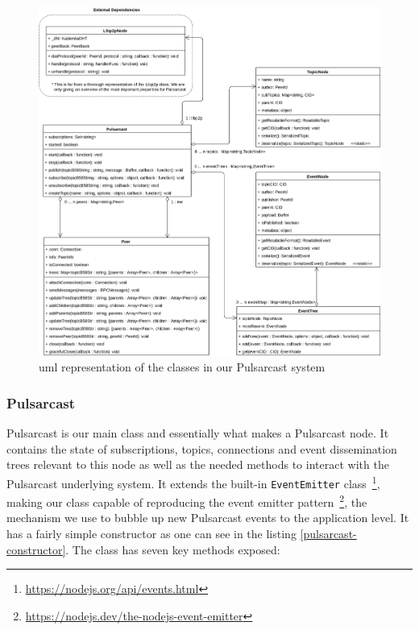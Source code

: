 \begin{figure}[hb!]
  \center
  \includegraphics[width=1\textwidth]{img/uml-pulsarcast.png}
  \caption{\acrshort{uml} representation of the classes in our Pulsarcast system}
  \label{fig:pulsarcast-uml}
\end{figure}

\subsubsection{Pulsarcast}\label{subsubsec:pulsarcast}

Pulsarcast is our main class and essentially what makes a Pulsarcast node. It
contains the state of subscriptions, topics, connections and event
dissemination trees relevant to this node as well as the needed methods to
interact with the Pulsarcast underlying system. It extends the built-in
\verb|EventEmitter| class~\footnote{\url{https://nodejs.org/api/events.html}}, making
our class capable of reproducing the event emitter
pattern~\footnote{\url{https://nodejs.dev/the-nodejs-event-emitter}}, the mechanism
we use to bubble up new Pulsarcast events to the application level. It has a
fairly simple constructor as one can see in the listing
\ref{pulsarcast-constructor}. The class has seven key methods exposed:

